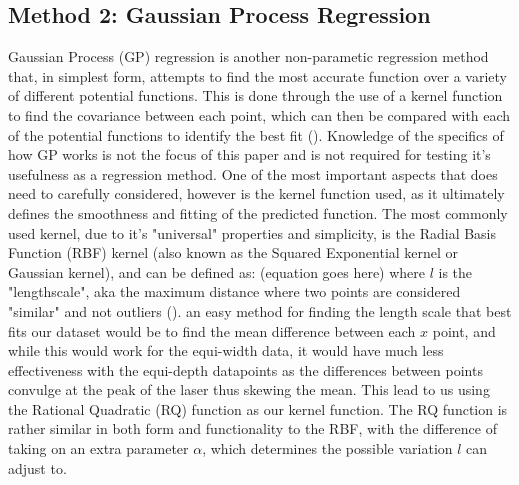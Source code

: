 \documentclass[letterpaper,12pt]{article}
\begin{document}
\subsection{Method 2: Gaussian Process Regression}
Gaussian Process (GP) regression is another non-parametic regression method that, in simplest
form, attempts to find the most accurate function over a variety of different potential functions.
This is done through the use of a kernel function to find the covariance between each point, which
can then be compared with each of the potential functions to identify the best fit 
(\cite{wang2020intuitive}). Knowledge of the specifics of how GP works is not the focus of
this paper and is not required for testing it's usefulness as a regression method. One of
the most important aspects that does need to carefully considered, however is the kernel 
function used, as it ultimately defines the smoothness and fitting of the predicted function.
The most commonly used kernel, due to it's "universal" properties and simplicity, is the
Radial Basis Function (RBF) kernel (also known as the Squared Exponential kernel or Gaussian
kernel), and can be defined as: (equation goes here) where $l$ is the "lengthscale", aka the
maximum distance where two points are considered "similar" and not outliers (\cite{Duvenaud}). 
an easy method for finding the length scale that best fits our dataset would be to find the 
mean difference between each $x$ point, and while this would work for the equi-width data,
it would have much less effectiveness with the equi-depth datapoints as the differences between 
points convulge at the peak of the laser thus skewing the mean. This lead to us using the 
Rational Quadratic (RQ) function as our kernel function. The RQ function is rather similar in 
both form and functionality to the RBF, with the difference of taking on an extra parameter 
$\alpha$, which determines the possible variation $l$ can adjust to. 
\end{document}
